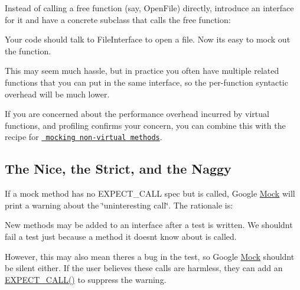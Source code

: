 Instead of calling a free function (say, {\ttfamily Open\+File}) directly, introduce an interface for it and have a concrete subclass that calls the free function\+:


\begin{DoxyCode}{0}
\DoxyCodeLine{ \textcolor{keyword}{public}:}
\DoxyCodeLine{\};}
\DoxyCodeLine{}
\DoxyCodeLine{ \textcolor{keyword}{public}:}
\DoxyCodeLine{  \}}
\DoxyCodeLine{\};}
\end{DoxyCode}


Your code should talk to {\ttfamily File\+Interface} to open a file. Now it\textquotesingle{}s easy to mock out the function.

This may seem much hassle, but in practice you often have multiple related functions that you can put in the same interface, so the per-\/function syntactic overhead will be much lower.

If you are concerned about the performance overhead incurred by virtual functions, and profiling confirms your concern, you can combine this with the recipe for \href{\#mocking-nonvirtual-methods}{\texttt{ mocking non-\/virtual methods}}.

\subsection*{The Nice, the Strict, and the Naggy}

If a mock method has no {\ttfamily E\+X\+P\+E\+C\+T\+\_\+\+C\+A\+LL} spec but is called, Google \mbox{\hyperlink{class_mock}{Mock}} will print a warning about the \char`\"{}uninteresting call\char`\"{}. The rationale is\+:


\begin{DoxyItemize}
\item New methods may be added to an interface after a test is written. We shouldn\textquotesingle{}t fail a test just because a method it doesn\textquotesingle{}t know about is called.
\item However, this may also mean there\textquotesingle{}s a bug in the test, so Google \mbox{\hyperlink{class_mock}{Mock}} shouldn\textquotesingle{}t be silent either. If the user believes these calls are harmless, they can add an {\ttfamily \mbox{\hyperlink{googletest-master_2googlemock_2include_2gmock_2gmock-spec-builders_8h_a535a6156de72c1a2e25a127e38ee5232}{E\+X\+P\+E\+C\+T\+\_\+\+C\+A\+L\+L()}}} to suppress the warning.
\end{DoxyItemize}

